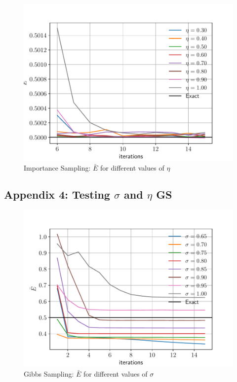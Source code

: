 \documentclass[%
oneside,                 %
final,                   %
10pt]{article}
\begin{document}
\begin{appendices}
\begin{figure}[H]
        \centering 
         \includegraphics[scale=0.7]{../Results/sim_4/IS_eta.pdf} 
        \caption{Importance Sampling:  $\bar E$ for different values of $\eta$ }
        \label{fig:training_IS}   
\end{figure}  

\subsection{Appendix 4: Testing $\sigma$ and $\eta$ GS}
\begin{figure}[H]
        \centering 
         \includegraphics[scale=0.7]{../Results/sim_7/GS_initial.pdf} 
        \caption{Gibbs Sampling:  $\bar E$ for different values of $\sigma$ }
        \label{fig:GS_sigma_initial}   
\end{figure}  


\end{appendices}
\end{document}
